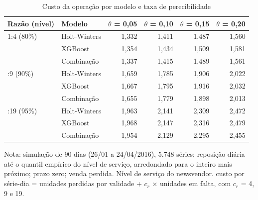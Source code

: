 \begin{table}[htbp]
\centering
\small
\caption{Custo da operação por modelo e taxa de perecibilidade}
\label{tab:sim_custo}
\begin{tabular}{llrrrr}
\toprule
Razão (nível) & Modelo & $\theta$ = 0,05 & $\theta$ = 0,10 & $\theta$ = 0,15 & $\theta$ = 0,20 \\
\midrule
1:4 (80\%) & Holt-Winters & 1,332 & 1,411 & 1,487 & 1,560 \\
 & XGBoost & 1,354 & 1,434 & 1,509 & 1,581 \\
 & Combinação & 1,337 & 1,415 & 1,489 & 1,561 \\
\addlinespace
1:9 (90\%) & Holt-Winters & 1,659 & 1,785 & 1,906 & 2,022 \\
 & XGBoost & 1,667 & 1,795 & 1,916 & 2,032 \\
 & Combinação & 1,655 & 1,779 & 1,898 & 2,013 \\
\addlinespace
1:19 (95\%) & Holt-Winters & 1,963 & 2,141 & 2,309 & 2,472 \\
 & XGBoost & 1,968 & 2,147 & 2,316 & 2,479 \\
 & Combinação & 1,954 & 2,129 & 2,295 & 2,455 \\
\bottomrule
\end{tabular}
\par\smallskip
{\footnotesize Nota: simulação de 90 dias (26/01 a 24/04/2016), 5.748 séries; reposição diária até o quantil empírico do nível de serviço, arredondado para o inteiro mais próximo; prazo zero; venda perdida. Nível de serviço do newsvendor. custo por série-dia = unidades perdidas por validade + $c_r$ × unidades em falta, com $c_r$ = 4, 9 e 19.}
\end{table}
